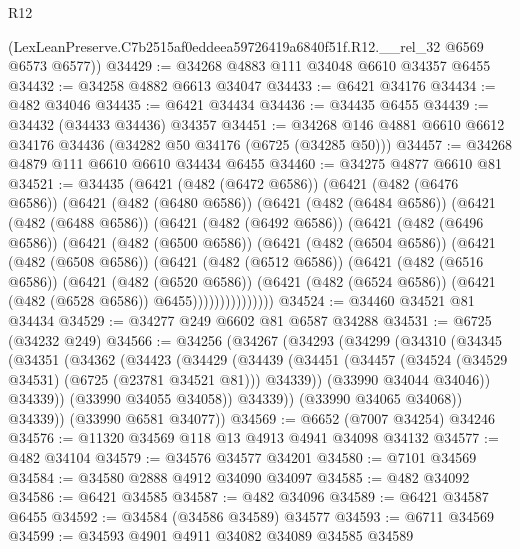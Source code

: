\begin{lexlean}{R12}
\begin{coremodule}
      (LexLeanPreserve.C7b2515af0eddeea59726419a6840f51f.R12.__rel_32 @6569 @6573 @6577))
@34429 := @34268 @4883 @111 @34048 @6610 @34357 @6455
@34432 := @34258 @4882 @6613 @34047
@34433 := @6421 @34176
@34434 := @482 @34046
@34435 := @6421 @34434
@34436 := @34435 @6455
@34439 := @34432 (@34433 @34436) @34357
@34451 := @34268 @146 @4881 @6610 @6612 @34176 @34436 (@34282 @50 @34176 (@6725 (@34285 @50)))
@34457 := @34268 @4879 @111 @6610 @6610 @34434 @6455
@34460 := @34275 @4877 @6610 @81
@34521 := @34435
    (@6421
      (@482 (@6472 @6586))
      (@6421
        (@482 (@6476 @6586))
        (@6421
          (@482 (@6480 @6586))
          (@6421
            (@482 (@6484 @6586))
            (@6421
              (@482 (@6488 @6586))
              (@6421
                (@482 (@6492 @6586))
                (@6421
                  (@482 (@6496 @6586))
                  (@6421
                    (@482 (@6500 @6586))
                    (@6421
                      (@482 (@6504 @6586))
                      (@6421
                        (@482 (@6508 @6586))
                        (@6421
                          (@482 (@6512 @6586))
                          (@6421
                            (@482 (@6516 @6586))
                            (@6421
                              (@482 (@6520 @6586))
                              (@6421
                                (@482 (@6524 @6586))
                                (@6421 (@482 (@6528 @6586)) @6455)))))))))))))))
@34524 := @34460 @34521 @81 @34434
@34529 := @34277 @249 @6602 @81 @6587 @34288
@34531 := @6725 (@34232 @249)
@34566 := @34256
    (@34267
      (@34293
        (@34299
          (@34310
            (@34345
              (@34351
                (@34362
                  (@34423
                    (@34429
                      (@34439
                        (@34451
                          (@34457 (@34524 (@34529 @34531) (@6725 (@23781 @34521 @81))) @34339))
                        (@33990 @34044 @34046))
                      @34339))
                  (@33990 @34055 @34058))
                @34339))
            (@33990 @34065 @34068))
          @34339))
      (@33990 @6581 @34077))
@34569 := @6652 (@7007 @34254) @34246
@34576 := @11320 @34569 @118 @13 @4913 @4941 @34098 @34132
@34577 := @482 @34104
@34579 := @34576 @34577 @34201
@34580 := @7101 @34569
@34584 := @34580 @2888 @4912 @34090 @34097
@34585 := @482 @34092
@34586 := @6421 @34585
@34587 := @482 @34096
@34589 := @6421 @34587 @6455
@34592 := @34584 (@34586 @34589) @34577
@34593 := @6711 @34569
@34599 := @34593 @4901 @4911 @34082 @34089 @34585 @34589

\end{coremodule}
\end{lexlean}
